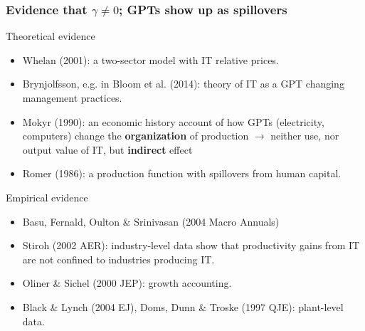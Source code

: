 \documentclass{beamer}
\begin{document}
\begin{frame}
\frametitle{Evidence that $\gamma \neq 0$; GPTs show up as spillovers}

Theoretical evidence
\begin{itemize}
\item Whelan (2001): a two-sector model with IT relative prices.
\item Brynjolfsson, e.g. in Bloom et al. (2014): theory of IT as a GPT changing management practices.
\item Mokyr (1990):  an economic history account of how GPTs (electricity, computers) change the \textbf{organization} of production $\rightarrow$ neither use, nor output value of IT, but \textbf{indirect} effect
\item Romer (1986): a production function with spillovers from human capital.
\end{itemize}

Empirical evidence
\begin{itemize}
\item Basu, Fernald, Oulton \& Srinivasan (2004 Macro Annuals)
\item Stiroh (2002 AER): industry-level data show that productivity gains from IT are not confined to industries producing IT.
\item Oliner \& Sichel (2000 JEP): growth accounting.
\item Black \& Lynch (2004 EJ), Doms, Dunn \& Troske (1997 QJE): plant-level data.
\end{itemize}

\end{frame}
\end{document}
